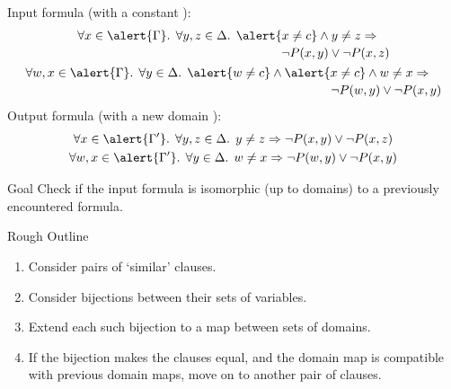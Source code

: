 \documentclass{beamer}
\begin{document}
\begin{frame}
\begin{columns}
\begin{column}{0.85\textwidth}
\begin{overprint}
\begin{example}
            Input formula (with a constant ):
            \begin{gather*}
              \begin{multlined}
                \forall x \in \alert{\Gamma}\text{. }\forall y, z \in \Delta\text{. }\alert{x \ne c} \land y \ne z \Rightarrow \\
                \neg P(x, y) \lor \neg P(x, z)
              \end{multlined} \\
              \begin{multlined}
                \forall w,x \in \alert{\Gamma}\text{. }\forall y \in \Delta\text{. }\alert{w \ne c} \land \alert{x \ne c} \land w \ne x \Rightarrow \\
                \neg P(w, y) \lor \neg P(x, y)
              \end{multlined}
            \end{gather*}
            Output formula (with a new domain ):
            \begin{gather*}
              \forall x \in \alert{\Gamma'}\text{. }\forall y, z \in \Delta\text{. }y \ne z \Rightarrow \neg P(x, y) \lor \neg P(x, z) \\
              \forall w,x \in \alert{\Gamma'}\text{. }\forall y \in \Delta\text{. }w \ne x \Rightarrow \neg P(w, y) \lor \neg P(x, y)
            \end{gather*}
          \end{example}
          \begin{block}{Goal}
            Check if the input formula is isomorphic (up to domains) to a
            previously encountered formula.
          \end{block}
          \begin{block}{Rough Outline}
            \begin{enumerate}
              \item Consider pairs of `similar' clauses.
              \item Consider bijections between their sets of variables.
              \item Extend each such bijection to a map between sets of domains.
              \item If the bijection makes the clauses equal, and the domain map
                    is compatible with previous domain maps, move on to another
                    pair of clauses.
            \end{enumerate}
          \end{block}
      \end{overprint}
    \end{column}
  \end{columns}
\end{frame}
\end{document}
